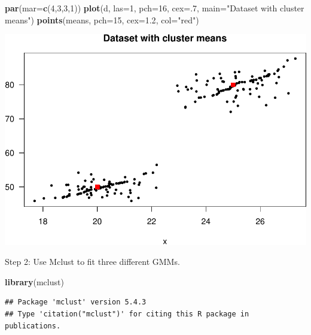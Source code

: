 \documentclass[]{article}
\newenvironment{Shaded}{\begin{snugshade}}{\end{snugshade}}
\newcommand{\DataTypeTok}[1]{\textcolor[rgb]{0.13,0.29,0.53}{#1}}
\newcommand{\DecValTok}[1]{\textcolor[rgb]{0.00,0.00,0.81}{#1}}
\newcommand{\FloatTok}[1]{\textcolor[rgb]{0.00,0.00,0.81}{#1}}
\newcommand{\KeywordTok}[1]{\textcolor[rgb]{0.13,0.29,0.53}{\textbf{#1}}}
\newcommand{\NormalTok}[1]{#1}
\newcommand{\StringTok}[1]{\textcolor[rgb]{0.31,0.60,0.02}{#1}}
\begin{document}
\begin{Shaded}
\begin{Highlighting}[]
\KeywordTok{par}\NormalTok{(}\DataTypeTok{mar=}\KeywordTok{c}\NormalTok{(}\DecValTok{4}\NormalTok{,}\DecValTok{3}\NormalTok{,}\DecValTok{3}\NormalTok{,}\DecValTok{1}\NormalTok{))}
\KeywordTok{plot}\NormalTok{(d, }\DataTypeTok{las=}\DecValTok{1}\NormalTok{, }\DataTypeTok{pch=}\DecValTok{16}\NormalTok{, }\DataTypeTok{cex=}\NormalTok{.}\DecValTok{7}\NormalTok{, }\DataTypeTok{main=}\StringTok{"Dataset with cluster means"}\NormalTok{)}
\KeywordTok{points}\NormalTok{(means, }\DataTypeTok{pch=}\DecValTok{15}\NormalTok{, }\DataTypeTok{cex=}\FloatTok{1.2}\NormalTok{, }\DataTypeTok{col=}\StringTok{"red"}\NormalTok{)}
\end{Highlighting}
\end{Shaded}

\includegraphics{mclust_sim_files/figure-latex/unnamed-chunk-1-1.pdf}

Step 2: Use Mclust to fit three different GMMs.

\begin{Shaded}
\begin{Highlighting}[]
\KeywordTok{library}\NormalTok{(mclust)}
\end{Highlighting}
\end{Shaded}

\begin{verbatim}
## Package 'mclust' version 5.4.3
## Type 'citation("mclust")' for citing this R package in publications.
\end{verbatim}
\end{document}

